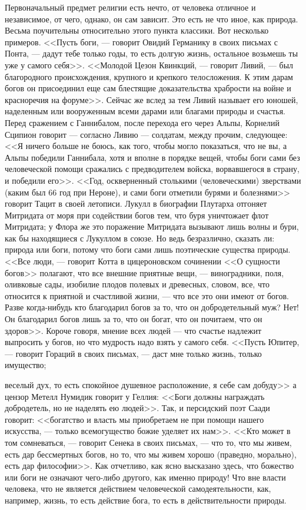 \documentclass[12pt]{article}
\begin{document}
Первоначальный предмет религии есть нечто, от человека отличное и независимое, от чего, однако, он сам зависит. Это есть не что иное, как природа. Весьма поучительны относительно этого пункта классики. Вот несколько примеров. <<Пусть боги, --- говорит Овидий Германику в своих письмах с Понта, --- дадут тебе только годы, то есть долгую жизнь, остальное возьмешь ты уже у самого себя>>. <<Молодой Цезон Квинкций, --- говорит Ливий, --- был благородного происхождения, крупного и крепкого телосложения. К этим дарам богов он присоединил еще сам блестящие доказательства храбрости на войне и красноречия на форуме>>. Сейчас же вслед за тем Ливий называет его юношей, наделенным или вооруженным всеми дарами или благами природы и счастья. Перед сражением с Ганнибалом, после перехода его через Альпы, Корнелий Сципион говорит --- согласно Ливию --- солдатам, между прочим, следующее: <<Я ничего больше не боюсь, как того, чтобы могло показаться, что не вы, а Альпы победили Ганнибала, хотя и вполне в порядке вещей, чтобы боги сами без человеческой помощи сражались с предводителем войска, ворвавшегося в страну, и победили его>>. <<Год, оскверненный столькими (человеческими) зверствами (каким был 66 год при Нероне), и сами боги отметили бурями и болезнями>>  говорит Тацит в своей летописи. Лукулл в биографии Плутарха отгоняет Митридата от моря при содействии богов тем, что буря уничтожает флот Митридата; у Флора же это поражение Митридата вызывают лишь волны и бури, как бы находящиеся с Лукуллом в союзе. Но ведь безразлично, сказать ли: природа или боги, потому что боги сами лишь поэтические существа природы. <<Все люди, --- говорит Котта в цицероновском сочинении <<О сущности богов>>  полагают, что все внешние приятные вещи, --- виноградники, поля, оливковые сады, изобилие плодов полевых и древесных, словом, все, что относится к приятной и счастливой жизни, --- что все это они имеют от богов. Разве когда-нибудь кто благодарил богов за то, что он добродетельный муж? Нет! Он благодарил богов лишь за то, что он богат, что он почитаем, что он здоров>>. Короче говоря, мнение всех людей --- что счастье надлежит выпросить у богов, но что мудрость надо взять у самого себя. <<Пусть Юпитер, --- говорит Гораций в своих письмах, --- даст мне только жизнь, только имущество; 

веселый дух, то есть спокойное душевное расположение, я себе сам добуду>>  а цензор Метелл Нумидик говорит у Геллия: <<Боги должны награждать добродетель, но не наделять ею людей>>. Так, и персидский поэт Саади говорит: <<богатство и власть мы приобретаем не при помощи нашего искусства, --- только всемогущество божие уделяет их нам>>. <<Кто может в том сомневаться, --- говорит Сенека в своих письмах, --- что то, что мы живем, есть дар бессмертных богов, но то, что мы живем хорошо (праведно, морально), есть дар философии>>. Как отчетливо, как ясно высказано здесь, что божество или боги не означают чего-либо другого, как именно природу! Что вне власти человека, что не является действием человеческой самодеятельности, как, например, жизнь, то есть действие бога, то есть в действительности природы. 
\end{document}
